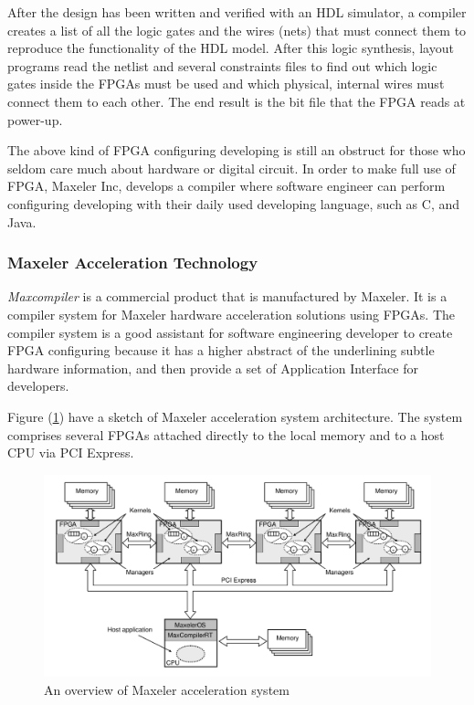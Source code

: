 After the design has been written and verified with an HDL simulator,
a compiler creates a list of all the logic gates and the wires (nets)
that must connect them to reproduce the functionality of the HDL model.
After this logic synthesis, layout programs read the netlist and several
constraints files to find out which logic gates inside the FPGAs must
be used and which physical, internal wires must connect them to each
other. The end result is the bit file that the FPGA reads at power-up.

The above kind of FPGA configuring developing is still an obstruct for
those who seldom care much about hardware or digital circuit. In order to
make full use of FPGA, Maxeler Inc, develops a compiler where software
engineer can perform configuring developing with their daily used
developing language, such as C, and Java.

\subsubsection{Maxeler Acceleration Technology}

\emph{Maxcompiler} is a commercial product that is manufactured by Maxeler.
It is a compiler system for Maxeler hardware acceleration solutions using
FPGAs. The compiler system is a good assistant for software engineering
developer to create FPGA configuring because it has a higher abstract of
the underlining subtle hardware information, and then provide a set of
Application Interface for developers.

Figure (\ref{fig:maxeler_acceleration_system}) have a sketch of Maxeler
acceleration system architecture. The system comprises several FPGAs
attached directly to the local memory and to a host CPU via PCI Express.

\begin{figure}
  \centering
  \includegraphics[scale=0.35]{img/overview_of_maxeler_acceleration_system.png}
  \caption{An overview of Maxeler acceleration system}
  \label{fig:maxeler_acceleration_system}
\end{figure}

